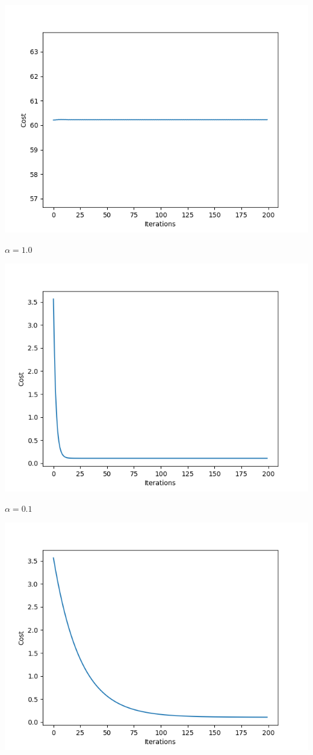 \documentclass[12pt]{article}
\begin{document}
\begin{center}
    
    \includegraphics[scale=0.55]{fig_1.png}
    
    $\alpha = 1.0$
    
    \includegraphics[scale=0.55]{fig_2.png}
    
    $\alpha = 0.1$
    
    \includegraphics[scale=0.55]{fig_3.png}
    

\end{center}
\end{document}
